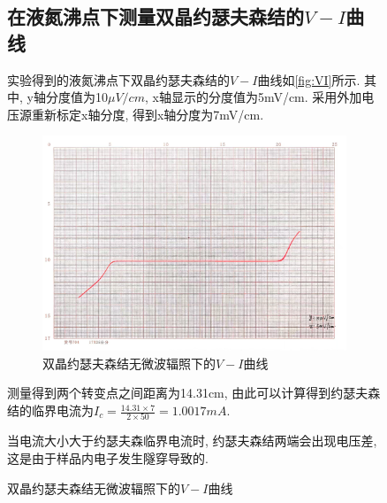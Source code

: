 \documentclass[font=default]{mpltx}
\begin{document}
\begin{figure}[h]
  \subsection{在液氮沸点下测量双晶约瑟夫森结的$V-I$曲线}
  实验得到的液氮沸点下双晶约瑟夫森结的$V-I$曲线如\autoref{fig:VI}所示. 其中, y轴分度值为10$\mu V/cm$, x轴显示的分度值为5mV/cm.
  采用外加电压源重新标定x轴分度, 得到x轴分度为7mV/cm.
   \begin{figure}[htbp]
    \centering
    \includegraphics[width=0.85\linewidth]{fig/4.jpg}
    \caption{双晶约瑟夫森结无微波辐照下的$V-I$曲线}
    \label{fig:VI}
  \end{figure}

  测量得到两个转变点之间距离为14.31cm, 由此可以计算得到约瑟夫森结的临界电流为$I_c=\frac{14.31\times 7}{2\times 50}=1.0017mA$.

  \par
  当电流大小大于约瑟夫森临界电流时, 约瑟夫森结两端会出现电压差, 这是由于样品内电子发生隧穿导致的.


\end{figure}
\end{document}
